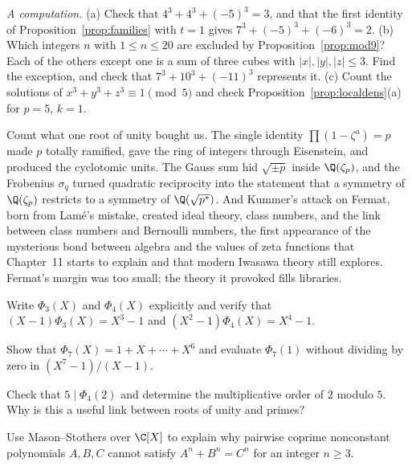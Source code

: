 \begin{exercise}[$\star$]\label{ex:threecubes}
\emph{A computation.} (a) Check that $4^3+4^3+(-5)^3=3$, and that the first identity of Proposition~\ref{prop:families} with
$t=1$ gives $7^3+(-5)^3+(-6)^3=2$. (b) Which integers $n$ with $1\le n\le 20$ are excluded by Proposition~\ref{prop:mod9}? Each of
the others except one is a sum of three cubes with $|x|,|y|,|z|\le 3$. Find the exception, and check that
$7^3+10^3+(-11)^3$ represents it. (c) Count the solutions of $x^3+y^3+z^3\equiv1\pmod 5$ and check Proposition~\ref{prop:localdens}(a) for $p=5$, $k=1$.
\end{exercise}

\begin{beauty}
Count what one root of unity bought us. The single identity $\prod(1-\zeta^a)=p$ made $p$ totally ramified, gave the ring of
integers through Eisenstein, and produced the cyclotomic units. The Gauss sum hid $\sqrt{\pm p}$ inside $\Q(\zeta_p)$, and
the Frobenius $\sigma_q$ turned quadratic reciprocity into the statement that a symmetry of $\Q(\zeta_p)$ restricts to a
symmetry of $\Q(\sqrt{p^*})$. And Kummer's attack on Fermat, born from Lamé's mistake, created ideal theory, class
numbers, and the link between class numbers and Bernoulli numbers, the first appearance of the mysterious bond between
algebra and the values of zeta functions that Chapter~11 starts to explain and that modern Iwasawa theory still explores.
Fermat's margin was too small; the theory it provoked fills libraries.
\end{beauty}

\begin{exercise}[$\star$]\label{ex:v13-extra-07-1}
Write $\Phi_3(X)$ and $\Phi_4(X)$ explicitly and verify that $(X-1)\Phi_3(X)=X^3-1$ and $(X^2-1)\Phi_4(X)=X^4-1$.
\end{exercise}

\begin{exercise}[$\star$]\label{ex:v13-extra-07-2}
Show that $\Phi_7(X)=1+X+\cdots+X^6$ and evaluate $\Phi_7(1)$ without dividing by zero in $(X^7-1)/(X-1)$.
\end{exercise}

\begin{exercise}[$\star\star$]\label{ex:v13-extra-07-3}
Check that $5\mid\Phi_4(2)$ and determine the multiplicative order of $2$ modulo $5$. Why is this a useful link between roots of unity and primes?
\end{exercise}

\begin{exercise}[$\star\star\star$]\label{ex:v13-extra-07-4}
Use Mason--Stothers over $\C[X]$ to explain why pairwise coprime nonconstant polynomials $A,B,C$ cannot satisfy $A^n+B^n=C^n$ for an integer $n\ge3$.
\end{exercise}

